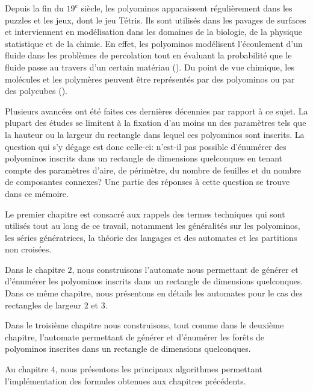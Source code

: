  Depuis la fin du $19^{e}$ siècle, les polyominos apparaissent régulièrement dans les puzzles et les jeux, dont le jeu Tétris. Ils sont utilisés dans les pavages de surfaces et interviennent en modélisation dans les domaines de la biologie, de la physique statistique et de la chimie.
 En effet, les polyominos modélisent l'écoulement d'un fluide dans les problèmes de percolation tout en évaluant la probabilité que le fluide passe au travers d'un certain matériau (\cite{Rous}). Du point de vue chimique, les molécules et les polymères peuvent être représentés par des polyominos ou par des polycubes (\cite{Bos2}).



 Plusieurs avancées ont été faites ces dernières décennies par rapport à ce sujet. La plupart des études se limitent  à la fixation d'au moins un des paramètres tels que la hauteur ou la largeur du rectangle  dans lequel ces polyominos sont inscrits. La question qui s'y dégage est donc celle-ci: n'est-il  pas possible d’énumérer des  polyominos inscrits dans un rectangle de dimensions  quelconques en tenant compte des paramètres d'aire, de périmètre, du nombre de feuilles et du nombre de composantes connexes? Une partie des réponses à cette question se trouve dans ce mémoire.



Le premier chapitre est consacré aux rappels  des termes techniques qui sont utilisés tout au long de ce travail, notamment les généralités sur les polyominos, les séries génératrices, la théorie des langages et des automates et les partitions non croisées.

Dans le chapitre $2$, nous construisons l'automate nous permettant de générer et d'énumérer les polyominos inscrits dans un rectangle de dimensions quelconques. Dans ce même chapitre, nous présentons en détails les automates  pour le cas des rectangles de largeur $2$ et $3$.

Dans le troisième chapitre nous construisons, tout comme dans le deuxième chapitre, l'automate permettant de générer et d’énumérer les forêts de polyominos inscrites dans un rectangle  de dimensions quelconques.

Au chapitre $4$, nous présentons les principaux algorithmes permettant l'implémentation des formules obtenues aux chapitres précédents.